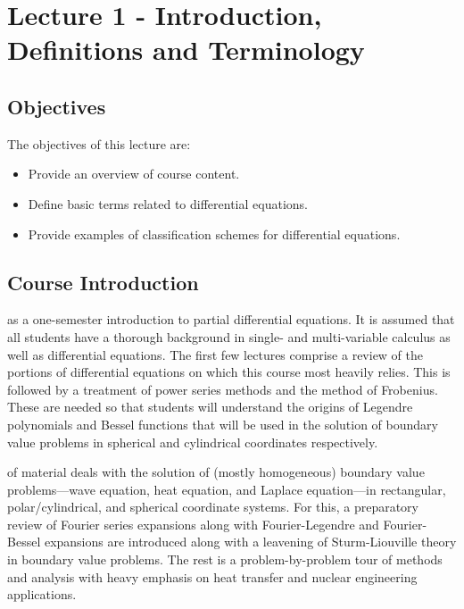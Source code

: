 \chapter{Lecture 1 - Introduction, Definitions and Terminology}
\label{ch:lec1}%
\section{Objectives}
The objectives of this lecture are:
\begin{itemize}
\item Provide an overview of course content.
\item Define basic terms related to differential equations.
\item Provide examples of classification schemes for differential equations.
\end{itemize}

\section{Course Introduction}
 as a one-semester introduction to partial differential equations.  It is assumed that all students have a thorough background in single- and multi-variable calculus as well as differential equations.  The first few lectures comprise a review of the portions of differential equations on which this course most heavily relies.  This is followed by a treatment of power series methods and the method of Frobenius.  These are needed so that students will understand the origins of Legendre polynomials and Bessel functions that will be used in the solution of boundary value problems in spherical and cylindrical coordinates respectively.

 of material deals with the solution of (mostly homogeneous) boundary value problems---wave equation, heat equation, and Laplace equation---in rectangular, polar/cylindrical, and spherical coordinate systems.  For this, a preparatory review of Fourier series expansions along with Fourier-Legendre and Fourier-Bessel expansions are introduced along with a leavening of Sturm-Liouville theory in boundary value problems.  The rest is a problem-by-problem tour of methods and analysis with heavy emphasis on heat transfer and nuclear engineering applications.

